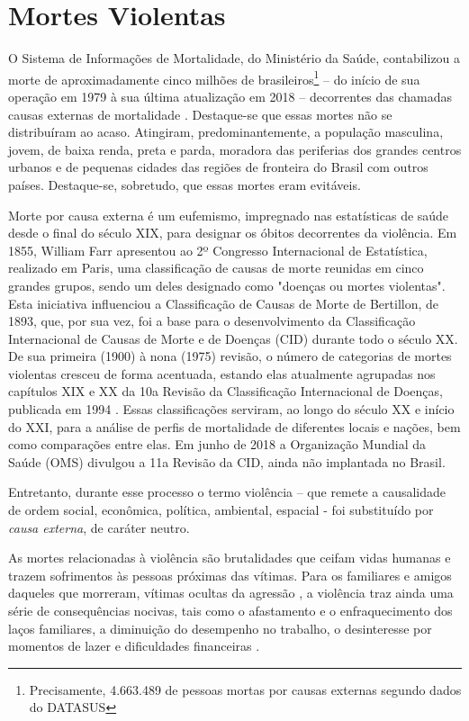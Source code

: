 \chapter{Mortes Violentas}

O Sistema de Informações de Mortalidade, do Ministério da Saúde, contabilizou a morte de aproximadamente cinco milhões de brasileiros\footnote{Precisamente, 4.663.489 de pessoas mortas por causas externas segundo dados do DATASUS} – do início de sua operação em 1979 à sua última atualização em 2018 – decorrentes das chamadas causas externas de mortalidade \citep{DataSUS2020}. Destaque-se que essas mortes não se distribuíram ao acaso. Atingiram, predominantemente, a população masculina, jovem, de baixa renda, preta e parda, moradora das periferias dos grandes centros urbanos e de pequenas cidades das regiões de fronteira do Brasil com outros países. Destaque-se, sobretudo, que essas mortes eram evitáveis.

Morte por causa externa é um eufemismo, impregnado nas estatísticas de saúde desde o final do século XIX, para designar os óbitos decorrentes da violência. Em 1855, William Farr apresentou ao 2º Congresso Internacional de Estatística, realizado em Paris, uma classificação de causas de morte reunidas em cinco grandes grupos, sendo um deles designado como "doenças ou mortes violentas"\citep{laurenti1991analise}. Esta iniciativa influenciou a Classificação de Causas de Morte de Bertillon, de 1893, que, por sua vez, foi a base para o desenvolvimento da Classificação Internacional de Causas de Morte e de Doenças (CID) durante todo o século XX. De sua primeira (1900) à nona (1975) revisão, o número de categorias de mortes violentas cresceu de forma acentuada, estando elas atualmente agrupadas nos capítulos XIX e XX da 10a Revisão da Classificação Internacional de Doenças, publicada em 1994 \citep{organizaccao2000classificaccao}. Essas classificações serviram, ao longo do século XX e início do XXI, para a análise de perfis de mortalidade de diferentes locais e nações, bem como comparações entre elas. Em junho de 2018 a Organização Mundial da Saúde (OMS) divulgou a 11a Revisão da CID, ainda não implantada no Brasil.

Entretanto, durante esse processo o termo violência – que remete a causalidade de ordem social, econômica, política, ambiental, espacial - foi substituído por \textit{causa externa}, de caráter neutro.

As mortes relacionadas à violência são brutalidades que ceifam vidas humanas e trazem sofrimentos às pessoas próximas das vítimas. Para os familiares e amigos daqueles que morreram, vítimas ocultas da agressão \citep{soares2006vitimas}, a violência traz ainda uma série de consequências nocivas, tais como o afastamento e o enfraquecimento dos laços familiares, a diminuição do desempenho no trabalho, o desinteresse por momentos de lazer e dificuldades financeiras \citep{costa2017repercussoes}.


